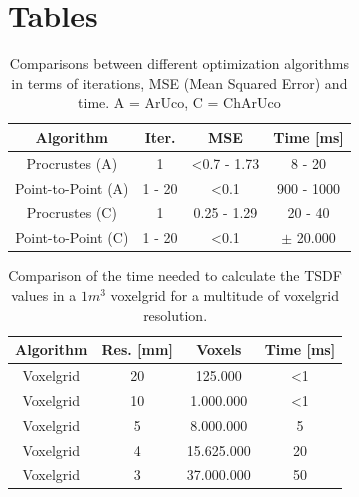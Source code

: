 \documentclass[10pt,twocolumn,letterpaper]{article}
\begin{document}
\newpage
\section{Tables}
\begin{table}[h!]
  \begin{center}
    \begin{tabular}{c|c|c|c}
      \textbf{Algorithm} & \textbf{Iter.} & \textbf{MSE} & \textbf{Time [ms]}\\
      \hline
      Procrustes (A)  & 1  & \textless 0.7 - 1.73 & 8 - 20\\
      Point-to-Point (A) & 1 - 20  & \textless 0.1 & 900 - 1000\\
      Procrustes (C) & 1  & 0.25 - 1.29 & 20 - 40\\
      Point-to-Point (C) & 1 - 20  & \textless 0.1 & $\pm$ 20.000\\
    \end{tabular}
     \caption{Comparisons between different optimization algorithms in terms of iterations, MSE (Mean Squared Error) and time. A = ArUco, C = ChArUco}
     \label{tab:camera-calibration}
  \end{center}
\end{table}

\begin{table}[h!]
  \begin{center}
    \begin{tabular}{c|c|c|c}
      \textbf{Algorithm} & \textbf{Res. [mm]} & \textbf{Voxels} & \textbf{Time [ms]}\\
      \hline
      Voxelgrid & 20 & 125.000 & \textless 1\\
      Voxelgrid & 10 & 1.000.000 & \textless 1\\
      Voxelgrid & 5 & 8.000.000 & 5\\
      Voxelgrid & 4 & 15.625.000 & 20\\
      Voxelgrid & 3 & 37.000.000 & 50\\
    \end{tabular}
     \caption{Comparison of the time needed to calculate the TSDF values in a $1m^3$ voxelgrid for a multitude of voxelgrid resolution.}
     \label{tab:voxelgrid}
  \end{center}
\end{table}
\end{document}
